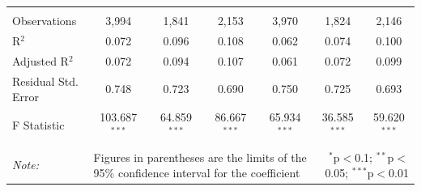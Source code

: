 \documentclass[alpha-refs]{wiley-article-01g}
\begin{document}
\begin{landscape}
\begin{table}[!htbp]
\begin{tabular}{@{\extracolsep{5pt}}lcccccc}
  & & & & & & \\ 
\hline \\[-3ex] 
Observations & 3,994 & 1,841 & 2,153 & 3,970 & 1,824 & 2,146 \\ 
R$^{2}$ & 0.072 & 0.096 & 0.108 & 0.062 & 0.074 & 0.100 \\ 
Adjusted R$^{2}$ & 0.072 & 0.094 & 0.107 & 0.061 & 0.072 & 0.099 \\ 
Residual Std. Error & 0.748 & 0.723 & 0.690 & 0.750 & 0.725 & 0.693 \\ 
F Statistic & 103.687$^{***}$ & 64.859$^{***}$ & 86.667$^{***}$ & 65.934$^{***}$ & 36.585$^{***}$ & 59.620$^{***}$ \\ 
\hline 
\hline \\[-3ex] 
\textit{Note:} &\multicolumn{4}{l}{Figures in parentheses are the limits of the 95\% confidence interval for the coefficient}  & \multicolumn{2}{r}{$^{*}$p$<$0.1; $^{**}$p$<$0.05; $^{***}$p$<$0.01} \\ 
\end{tabular} 
\end{table} 

\end{landscape}

\newpage
\end{document}
